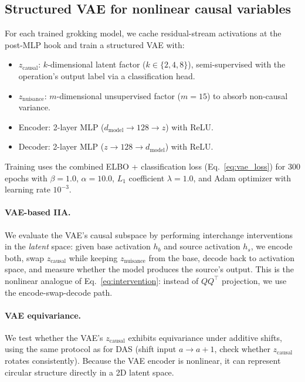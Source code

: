 \documentclass{article}
\begin{document}
\subsection{Structured VAE for nonlinear causal variables}
\label{sec:vae_method}

For each trained grokking model, we cache residual-stream activations at the
post-MLP hook and train a structured VAE with:
\begin{itemize}[leftmargin=*]
\item $z_\text{causal}$: $k$-dimensional latent factor ($k \in \{2,4,8\}$),
  semi-supervised with the operation's output label via a classification head.
\item $z_\text{nuisance}$: $m$-dimensional unsupervised factor ($m = 15$) to
  absorb non-causal variance.
\item Encoder: 2-layer MLP ($d_\text{model} \to 128 \to z$) with ReLU.
\item Decoder: 2-layer MLP ($z \to 128 \to d_\text{model}$) with ReLU.
\end{itemize}

Training uses the combined ELBO + classification loss (Eq.~\ref{eq:vae_loss})
for 300 epochs with $\beta = 1.0$, $\alpha = 10.0$, $L_1$ coefficient
$\lambda = 1.0$, and Adam optimizer with learning rate $10^{-3}$.

\paragraph{VAE-based IIA.}
We evaluate the VAE's causal subspace by performing interchange interventions in
the \emph{latent} space: given base activation $h_b$ and source activation
$h_s$, we encode both, swap $z_\text{causal}$ while keeping $z_\text{nuisance}$
from the base, decode back to activation space, and measure whether the model
produces the source's output. This is the nonlinear analogue of
Eq.~\ref{eq:intervention}: instead of $QQ^\top$ projection, we use the
encode-swap-decode path.

\paragraph{VAE equivariance.}
We test whether the VAE's $z_\text{causal}$ exhibits equivariance under additive
shifts, using the same protocol as for DAS (shift input $a \to a+1$, check
whether $z_\text{causal}$ rotates consistently). Because the VAE encoder is
nonlinear, it can represent circular structure directly in a 2D latent space.
\end{document}
